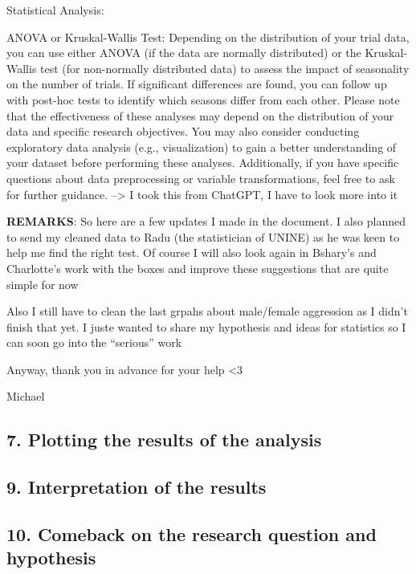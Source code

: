 \documentclass[
]{article}
\begin{document}
Statistical Analysis:

ANOVA or Kruskal-Wallis Test: Depending on the distribution of your
trial data, you can use either ANOVA (if the data are normally
distributed) or the Kruskal-Wallis test (for non-normally distributed
data) to assess the impact of seasonality on the number of trials. If
significant differences are found, you can follow up with post-hoc tests
to identify which seasons differ from each other. Please note that the
effectiveness of these analyses may depend on the distribution of your
data and specific research objectives. You may also consider conducting
exploratory data analysis (e.g., visualization) to gain a better
understanding of your dataset before performing these analyses.
Additionally, if you have specific questions about data preprocessing or
variable transformations, feel free to ask for further guidance.
--\textgreater{} I took this from ChatGPT, I have to look more into it

\textbf{REMARKS}: So here are a few updates I made in the document. I
also planned to send my cleaned data to Radu (the statistician of UNINE)
as he was keen to help me find the right test. Of course I will also
look again in Bshary's and Charlotte's work with the boxes and improve
these suggestions that are quite simple for now

Also I still have to clean the last grpahs about male/female aggression
as I didn't finish that yet. I juste wanted to share my hypothesis and
ideas for statistics so I can soon go into the ``serious'' work

Anyway, thank you in advance for your help \textless3

Michael

\hypertarget{plotting-the-results-of-the-analysis}{%
\subsection{7. Plotting the results of the
analysis}\label{plotting-the-results-of-the-analysis}}

\hypertarget{interpretation-of-the-results}{%
\subsection{9. Interpretation of the
results}\label{interpretation-of-the-results}}

\hypertarget{comeback-on-the-research-question-and-hypothesis}{%
\subsection{10. Comeback on the research question and
hypothesis}\label{comeback-on-the-research-question-and-hypothesis}}
\end{document}

